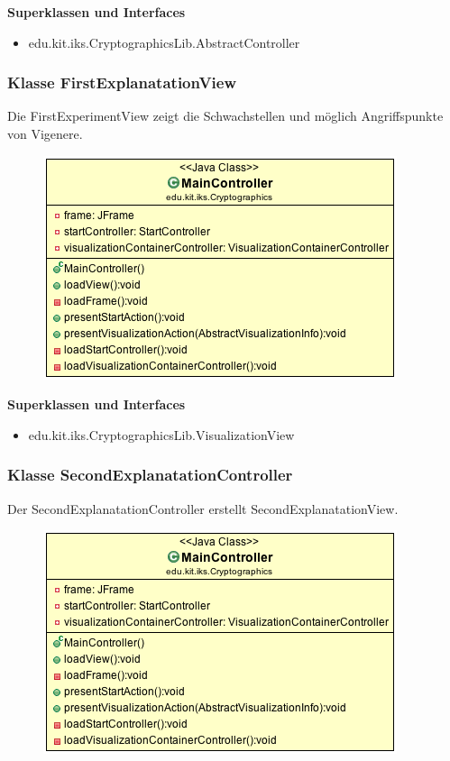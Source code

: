\documentclass{article}
\begin{document}
      \textbf{Superklassen und Interfaces}
      \begin{itemize}
        \item edu.kit.iks.CryptographicsLib.AbstractController
      \end{itemize}

    \subsubsection{Klasse FirstExplanatationView}
      Die FirstExperimentView zeigt die Schwachstellen und möglich Angriffspunkte von Vigenere.
      \begin{figure}[H]
        \centering
        \includegraphics[width=\textwidth]{resources/edu-kit-iks-Cryptographics-MainController}
      \end{figure}

      \textbf{Superklassen und Interfaces}
      \begin{itemize}
        \item edu.kit.iks.CryptographicsLib.VisualizationView
      \end{itemize}

    \subsubsection{Klasse SecondExplanatationController}
      Der SecondExplanatationController erstellt SecondExplanatationView.
      \begin{figure}[H]
        \centering
        \includegraphics[width=\textwidth]{resources/edu-kit-iks-Cryptographics-MainController}
      \end{figure}
\end{document}
